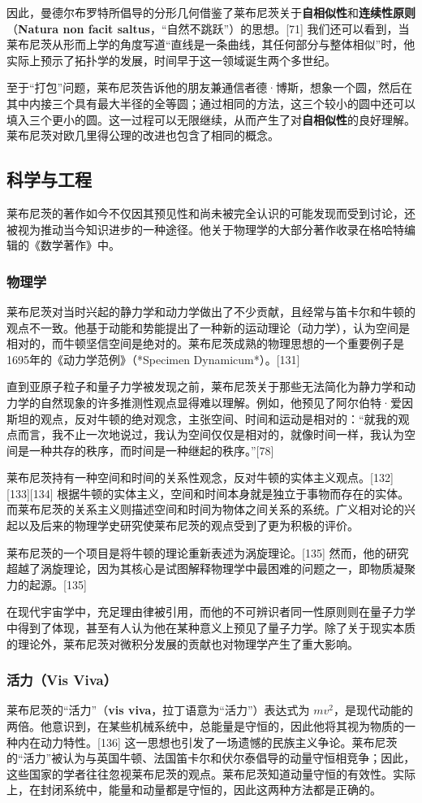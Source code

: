 因此，曼德尔布罗特所倡导的分形几何借鉴了莱布尼茨关于\textbf{自相似性}和\textbf{连续性原则}（\textbf{Natura non facit saltus}，“自然不跳跃”）的思想。[71] 我们还可以看到，当莱布尼茨从形而上学的角度写道“直线是一条曲线，其任何部分与整体相似”时，他实际上预示了拓扑学的发展，时间早于这一领域诞生两个多世纪。  

至于“打包”问题，莱布尼茨告诉他的朋友兼通信者德·博斯，想象一个圆，然后在其中内接三个具有最大半径的全等圆；通过相同的方法，这三个较小的圆中还可以填入三个更小的圆。这一过程可以无限继续，从而产生了对\textbf{自相似性}的良好理解。莱布尼茨对欧几里得公理的改进也包含了相同的概念。
\subsection{科学与工程}  
莱布尼茨的著作如今不仅因其预见性和尚未被完全认识的可能发现而受到讨论，还被视为推动当今知识进步的一种途径。他关于物理学的大部分著作收录在格哈特编辑的《数学著作》中。
\subsubsection{物理学}  
莱布尼茨对当时兴起的静力学和动力学做出了不少贡献，且经常与笛卡尔和牛顿的观点不一致。他基于动能和势能提出了一种新的运动理论（动力学），认为空间是相对的，而牛顿坚信空间是绝对的。莱布尼茨成熟的物理思想的一个重要例子是1695年的《动力学范例》（*Specimen Dynamicum*）。[131]  

直到亚原子粒子和量子力学被发现之前，莱布尼茨关于那些无法简化为静力学和动力学的自然现象的许多推测性观点显得难以理解。例如，他预见了阿尔伯特·爱因斯坦的观点，反对牛顿的绝对观念，主张空间、时间和运动是相对的：“就我的观点而言，我不止一次地说过，我认为空间仅仅是相对的，就像时间一样，我认为空间是一种共存的秩序，而时间是一种继起的秩序。”[78]  

莱布尼茨持有一种空间和时间的关系性观念，反对牛顿的实体主义观点。[132][133][134] 根据牛顿的实体主义，空间和时间本身就是独立于事物而存在的实体。而莱布尼茨的关系主义则描述空间和时间为物体之间关系的系统。广义相对论的兴起以及后来的物理学史研究使莱布尼茨的观点受到了更为积极的评价。

莱布尼茨的一个项目是将牛顿的理论重新表述为涡旋理论。[135] 然而，他的研究超越了涡旋理论，因为其核心是试图解释物理学中最困难的问题之一，即物质凝聚力的起源。[135]  

在现代宇宙学中，充足理由律被引用，而他的不可辨识者同一性原则则在量子力学中得到了体现，甚至有人认为他在某种意义上预见了量子力学。除了关于现实本质的理论外，莱布尼茨对微积分发展的贡献也对物理学产生了重大影响。
\subsubsection{活力（Vis Viva）}
莱布尼茨的“活力”（\textbf{vis viva}，拉丁语意为“活力”）表达式为 \( mv^2 \)，是现代动能的两倍。他意识到，在某些机械系统中，总能量是守恒的，因此他将其视为物质的一种内在动力特性。[136] 这一思想也引发了一场遗憾的民族主义争论。莱布尼茨的“活力”被认为与英国牛顿、法国笛卡尔和伏尔泰倡导的动量守恒相竞争；因此，这些国家的学者往往忽视莱布尼茨的观点。莱布尼茨知道动量守恒的有效性。实际上，在封闭系统中，能量和动量都是守恒的，因此这两种方法都是正确的。
